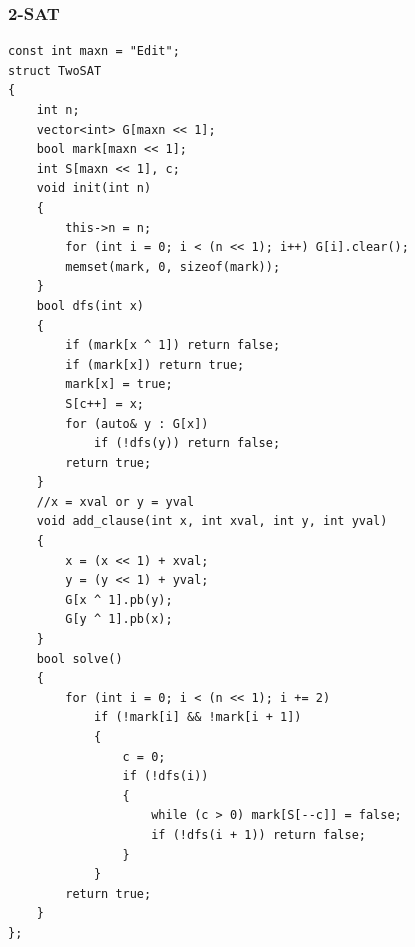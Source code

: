 \documentclass[twoside]{article}
\begin{document}
\subsubsection{2-SAT}
\begin{lstlisting}
const int maxn = "Edit";
struct TwoSAT
{
    int n;
    vector<int> G[maxn << 1];
    bool mark[maxn << 1];
    int S[maxn << 1], c;
    void init(int n)
    {
        this->n = n;
        for (int i = 0; i < (n << 1); i++) G[i].clear();
        memset(mark, 0, sizeof(mark));
    }
    bool dfs(int x)
    {
        if (mark[x ^ 1]) return false;
        if (mark[x]) return true;
        mark[x] = true;
        S[c++] = x;
        for (auto& y : G[x])
            if (!dfs(y)) return false;
        return true;
    }
    //x = xval or y = yval
    void add_clause(int x, int xval, int y, int yval)
    {
        x = (x << 1) + xval;
        y = (y << 1) + yval;
        G[x ^ 1].pb(y);
        G[y ^ 1].pb(x);
    }
    bool solve()
    {
        for (int i = 0; i < (n << 1); i += 2)
            if (!mark[i] && !mark[i + 1])
            {
                c = 0;
                if (!dfs(i))
                {
                    while (c > 0) mark[S[--c]] = false;
                    if (!dfs(i + 1)) return false;
                }
            }
        return true;
    }
};
\end{lstlisting}
\end{document}
